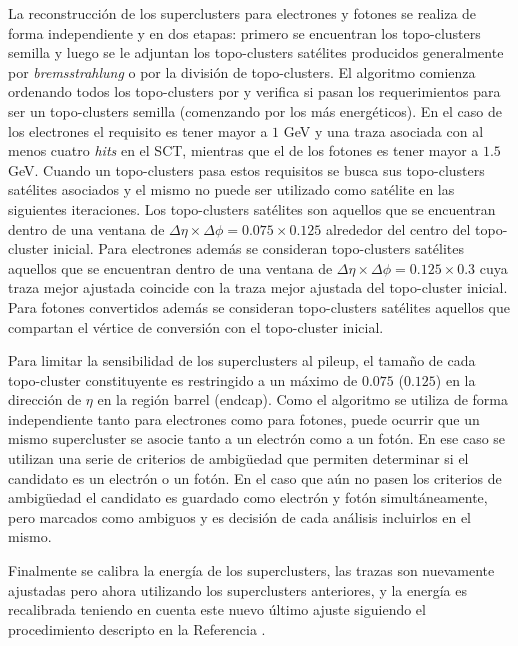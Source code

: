 La reconstrucción de los superclusters para electrones y fotones se realiza de forma independiente y en dos etapas: primero se encuentran los topo-clusters semilla 
 y luego se le adjuntan los topo-clusters satélites producidos generalmente por \textit{bremsstrahlung} o por la división de topo-clusters. El algoritmo comienza ordenando todos los topo-clusters por \ET y verifica si pasan los requerimientos para ser un topo-clusters semilla (comenzando por los más energéticos). En el caso de los electrones el requisito es tener \ET mayor a $1$ GeV y una traza asociada con al menos cuatro \textit{hits} en el SCT, mientras que el de los fotones es tener \ET mayor a $1.5$ GeV. Cuando un topo-clusters pasa estos requisitos se busca sus topo-clusters satélites asociados y el mismo no puede ser utilizado como satélite en las siguientes iteraciones. Los topo-clusters satélites son aquellos que se encuentran dentro de una ventana de $\Delta\eta\times\Delta\phi=0.075\times0.125$ alrededor del centro del topo-cluster inicial. Para electrones además se consideran topo-clusters satélites aquellos que se encuentran dentro de una ventana de $\Delta\eta\times\Delta\phi=0.125\times0.3$ cuya traza mejor ajustada coincide con la traza mejor ajustada del topo-cluster inicial. Para fotones convertidos además se consideran topo-clusters satélites aquellos que compartan el vértice de conversión con el topo-cluster inicial. 

Para limitar la sensibilidad de los superclusters al pileup, el tamaño de cada topo-cluster constituyente es restringido a un máximo de $0.075$ ($0.125$) en la dirección de $\eta$  en la región barrel (endcap). Como el algoritmo se utiliza de forma independiente tanto para electrones como para fotones, puede ocurrir que un mismo supercluster se asocie tanto a un electrón como a un fotón. En ese caso se utilizan una serie de criterios de ambigüedad que permiten determinar si el candidato es un electrón o un fotón. En el caso que aún no pasen los criterios de ambigüedad el candidato es guardado como electrón y fotón simultáneamente, pero marcados como ambiguos y es decisión de cada análisis incluirlos en el mismo.

Finalmente se calibra la energía de los superclusters, las trazas son nuevamente ajustadas pero ahora utilizando los superclusters anteriores, y la energía es recalibrada teniendo en cuenta este nuevo último ajuste siguiendo el procedimiento descripto en la Referencia \cite{PERF-2017-03}.

